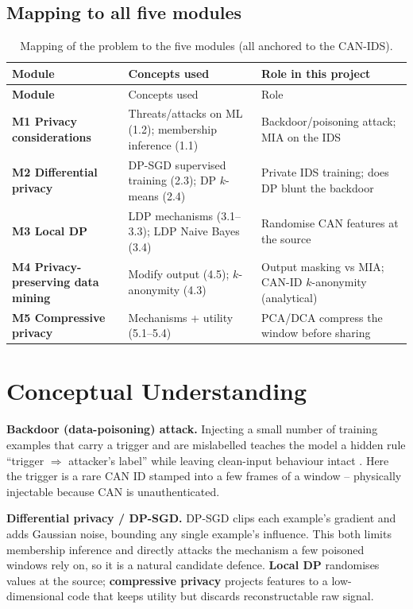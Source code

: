 \documentclass[11pt,a4paper]{article}
\begin{document}
\subsection{Mapping to all five modules}
\begin{longtable}{>{\bfseries}p{1.4cm}p{7.2cm}p{4.6cm}}
\caption{Mapping of the problem to the five modules (all anchored to the CAN-IDS).}\label{tab:map}\\
\toprule Module & Concepts used & Role in this project\\ \midrule\endfirsthead
\toprule Module & Concepts used & Role\\ \midrule\endhead
M1 Privacy considerations & Threats/attacks on ML (1.2); membership inference (1.1) & Backdoor/poisoning attack; MIA on the IDS\\
M2 Differential privacy & DP-SGD supervised training (2.3); DP $k$-means (2.4) & Private IDS training; does DP blunt the backdoor\\
M3 Local DP & LDP mechanisms (3.1--3.3); LDP Naive Bayes (3.4) & Randomise CAN features at the source\\
M4 Privacy-preserving data mining & Modify output (4.5); $k$-anonymity (4.3) & Output masking vs MIA; CAN-ID $k$-anonymity (analytical)\\
M5 Compressive privacy & Mechanisms + utility (5.1--5.4) & PCA/DCA compress the window before sharing\\
\bottomrule\end{longtable}

\section{Conceptual Understanding}\label{sec:concept}
\textbf{Backdoor (data-poisoning) attack.} Injecting a small number of training
examples that carry a trigger and are mislabelled teaches the model a hidden rule
``trigger $\Rightarrow$ attacker's label'' while leaving clean-input behaviour
intact \citep{gu2017badnets}. Here the trigger is a rare CAN ID stamped into a few
frames of a window -- physically injectable because CAN is unauthenticated.

\noindent\textbf{Differential privacy / DP-SGD.} DP-SGD \citep{abadi2016deep} clips
each example's gradient and adds Gaussian noise, bounding any single example's
influence. This both limits membership inference \citep{shokri2017membership} and
directly attacks the mechanism a few poisoned windows rely on, so it is a natural
candidate defence. \textbf{Local DP} \citep{duchi2013local,wang2019collecting}
randomises values at the source; \textbf{compressive privacy}
\citep{kung2017compressive} projects features to a low-dimensional code that keeps
utility but discards reconstructable raw signal.
\end{document}

